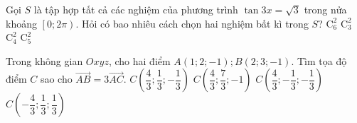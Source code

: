 \begin{ex}%
		Gọi $S$ là tập hợp tất cả các nghiệm của phương trình $\tan 3x=\sqrt{3}$ trong nửa khoảng $\left[0;2\pi\right)$. Hỏi có bao nhiêu cách chọn hai nghiệm bất kì trong $S$?
	\choice
		{\True $\mathrm{C}_6^2$}
		{$\mathrm{C}_3^2$}
		{$\mathrm{C}_4^2$}
		{$\mathrm{C}_5^2$}
\end{ex}
\begin{ex}%
		Trong không gian $Oxyz$, cho hai điểm $A\left(1;2;-1\right); B\left(2;3;-1\right)$. Tìm tọa độ điểm $C$ sao cho $\vec{AB}=3\vec{AC}$.
		\choice
		{$C\left(\dfrac{4}{3};\dfrac{1}{3};-\dfrac{1}{3}\right)$}
		{\True $C\left(\dfrac{4}{3};\dfrac{7}{3};-1\right)$}
		{$C\left(\dfrac{4}{3};-\dfrac{1}{3};-\dfrac{1}{3}\right)$}
		{$C\left(-\dfrac{4}{3};\dfrac{1}{3};\dfrac{1}{3}\right)$}
\end{ex}
